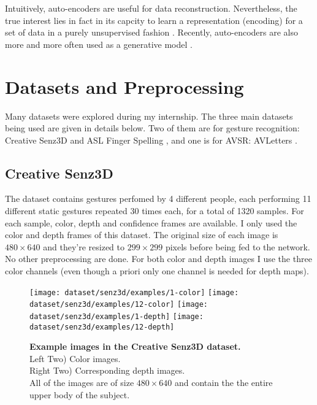 Intuitively, auto-encoders are useful for data reconstruction.
Nevertheless, the true interest lies in fact in its capcity to learn
a representation (encoding) for a set of data in a purely unsupervised
fashion \cite{P. Vincent 2010}. Recently, auto-encoders are also
more and more often used as a generative model \cite{Y. Bengio 2013}.

\section{Datasets and Preprocessing} \label{section:dataset}

Many datasets were explored during my internship. The three main datasets
being used are given in details  below. Two of them are for gesture
recognition:
Creative Senz3D \cite{A. Memo 2015, A. Memo 2017} and ASL Finger Spelling
\cite{N. Pugeault 2011}, and one is for AVSR: AVLetters
\cite{I. Matthews 2002}.

\subsection{Creative Senz3D}

The dataset contains gestures perfomed by 4 different people, each
performing 11 different static gestures repeated 30 times each,
for a total of 1320 samples.
For each sample, color, depth and confidence frames are available.
I only used the color and depth frames of this dataset. The original
size of each image is $480 \times 640$ and they're resized to
$299 \times 299$ pixels before being fed to the network. No other
preprocessing are done. For both color and depth images I use the three
color channels (even though a priori only one channel is needed for
depth maps).

\begin{figure}[H]
  \centering
  \hfill
  \texttt{[image: dataset/senz3d/examples/1-color]}
  \hfill
  \texttt{[image: dataset/senz3d/examples/12-color]}
  \hfill
  \texttt{[image: dataset/senz3d/examples/1-depth]}
  \hfill
  \texttt{[image: dataset/senz3d/examples/12-depth]}
  \caption{%
    \textbf{Example images in the Creative Senz3D dataset.}\\[0.1em]
    Left Two) Color images.\\[0.1em]
    Right Two) Corresponding depth images.\\[0.1em]
    All of the images are of size $480 \times 640$ and contain the
      the entire upper body of the subject.}
  \label{fig:senz3d_exs}
\end{figure}


